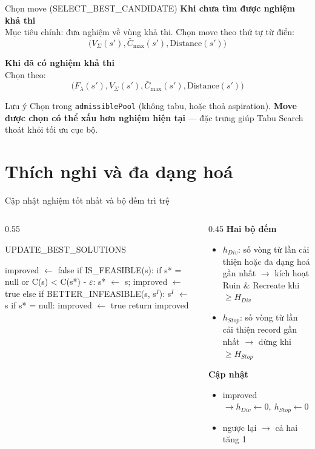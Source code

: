 \documentclass[aspectratio=169]{beamer}
\newcommand{\hl}[1]{\textcolor{blue!60!black}{\textbf{#1}}}
\newenvironment{pseudo}{\par\scriptsize\ttfamily\obeylines\obeyspaces}{\par}
\newcommand{\ind}{\hspace*{1.2em}}
\begin{document}
\begin{frame}{Chọn move (SELECT\_BEST\_CANDIDATE)}
  \textbf{Khi chưa tìm được nghiệm khả thi}\\
  \small Mục tiêu chính: đưa nghiệm về vùng khả thi. Chọn move theo thứ tự từ điển:
  $$\big(V_\Sigma(s'), \bar{C}_{\max}(s'), \text{Distance}(s')\big)$$

  \vspace{2mm}
  \textbf{Khi đã có nghiệm khả thi}\\
  \small Chọn theo:
  $$\big(F_\lambda(s'), V_\Sigma(s'), \bar{C}_{\max}(s'), \text{Distance}(s')\big)$$

  \vspace{2mm}
  \begin{block}{Lưu ý}
    \small Chọn trong \texttt{admissiblePool} (không tabu, hoặc thoả aspiration). \hl{Move được chọn có thể xấu hơn nghiệm hiện tại} — đặc trưng giúp Tabu Search thoát khỏi tối ưu cục bộ.
  \end{block}
\end{frame}

\section{Thích nghi và đa dạng hoá}

\begin{frame}[fragile]{Cập nhật nghiệm tốt nhất và bộ đếm trì trệ}
  \begin{columns}[T]
    \begin{column}{0.55\textwidth}
      \begin{block}{UPDATE\_BEST\_SOLUTIONS}
        \begin{pseudo}
improved $\leftarrow$ false
if IS\_FEASIBLE(s):
\ind if s* = null or C(s) < C(s*) - $\varepsilon$:
\ind\ind s* $\leftarrow$ s; improved $\leftarrow$ true
else if BETTER\_INFEASIBLE(s, s$^I$):
\ind s$^I$ $\leftarrow$ s
\ind if s* = null: improved $\leftarrow$ true
return improved
        \end{pseudo}
      \end{block}
    \end{column}
    \begin{column}{0.45\textwidth}
      \textbf{Hai bộ đếm}
      \begin{itemize}
        \item \small $h_{Div}$: số vòng từ lần cải thiện hoặc đa dạng hoá gần nhất $\to$ kích hoạt Ruin \& Recreate khi $\ge H_{Div}$
        \item \small $h_{Stop}$: số vòng từ lần cải thiện record gần nhất $\to$ dừng khi $\ge H_{Stop}$
      \end{itemize}
      \textbf{Cập nhật}
      \begin{itemize}
        \item \small improved $\to h_{Div} \leftarrow 0,\ h_{Stop} \leftarrow 0$
        \item \small ngược lại $\to$ cả hai tăng 1
      \end{itemize}
    \end{column}
  \end{columns}
\end{frame}
\end{document}
